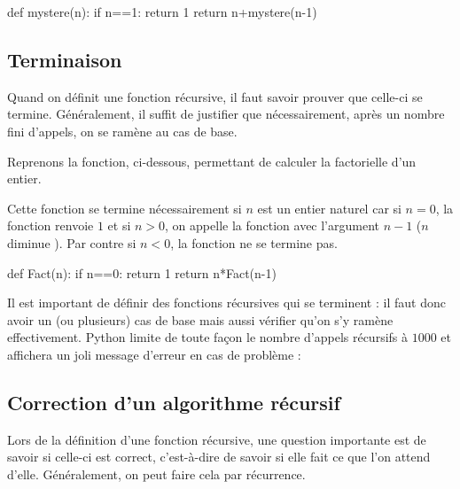 \documentclass[french,11pt,twoside]{VcCours}
\begin{document}
\begin{Python}
def mystere(n):
    if n==1:
        return 1
    return n+mystere(n-1)
\end{Python} 


\vspace{4cm}


\subsection{Terminaison}

Quand on définit une fonction récursive, il faut savoir prouver que celle-ci se termine. Généralement, il suffit de justifier que nécessairement, après un nombre fini d'appels, on se ramène au cas de base. 

\begin{Exercice}{} Reprenons la fonction, ci-dessous, permettant de calculer la factorielle d'un entier.

Cette fonction se termine nécessairement si $n$ est un entier naturel car si $n=0$, la fonction renvoie $1$ et si $n>0$, on appelle la fonction avec l'argument $n-1$ ($n$ \og diminue \fg). Par contre si $n<0$, la fonction ne se termine pas.
\end{Exercice}
\begin{Python}
def Fact(n):
    if n==0:
        return 1
    return n*Fact(n-1)
\end{Python} 

\begin{Remarque}{} 
Il est important de définir des fonctions récursives qui se terminent : il faut donc avoir un (ou plusieurs) cas de base mais aussi vérifier qu'on s'y ramène effectivement. Python limite de toute façon le nombre d'appels récursifs à $1000$ et affichera un joli message d'erreur en cas de problème :

\begin{center}
\end{center}
\end{Remarque}

\subsection{Correction d'un algorithme récursif}

Lors de la définition d'une fonction récursive, une question importante est de savoir si celle-ci est correct, c'est-à-dire de savoir si elle fait ce que l'on attend d'elle. Généralement, on peut faire cela par récurrence. 
\end{document}
